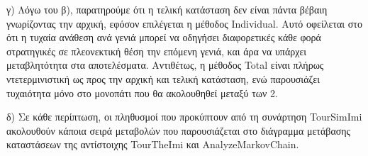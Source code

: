 \documentclass[12pt]{article}
\begin{document}
γ) Λόγω του β), παρατηρούμε ότι η τελική κατάσταση δεν είναι πάντα βέβαιη γνωρίζοντας την αρχική, εφόσον επιλέγεται η μέθοδος Individual. Αυτό οφείλεται στο ότι η τυχαία ανάθεση ανά γενιά μπορεί να οδηγήσει διαφορετικές κάθε φορά στρατηγικές σε πλεονεκτική θέση την επόμενη γενιά, και άρα να υπάρχει μεταβλητότητα στα αποτελέσματα. Αντιθέτως, η μέθοδος Total είναι πλήρως ντετερμινιστική ως προς την αρχική και τελική κατάσταση, ενώ παρουσιάζει τυχαιότητα μόνο στο μονοπάτι που θα ακολουθηθεί μεταξύ των 2.

δ) Σε κάθε περίπτωση, οι πληθυσμοί που προκύπτουν από τη συνάρτηση Tour\-Sim\-Imi ακολουθούν κάποια σειρά μεταβολών που παρουσιάζεται στο διάγραμμα μετάβασης καταστάσεων της αντίστοιχης Tour\-The\-Imi και Analyze\-Markov\-Chain.
\clearpage
\listoffigures{}
\end{document}
